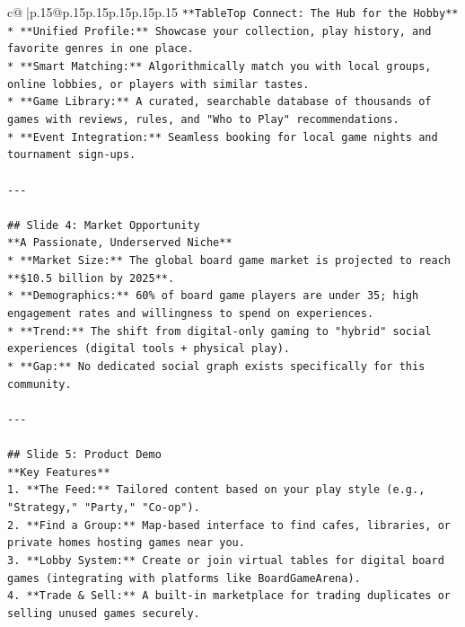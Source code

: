\documentclass{article}
\begin{document}
{\begin{supertabular}{c@{$\;$}|p{.15\linewidth}@{}p{.15\linewidth}p{.15\linewidth}p{.15\linewidth}p{.15\linewidth}p{.15\linewidth}}
{{{\texttt{**TableTop Connect: The Hub for the Hobby**} \\
\texttt{*   **Unified Profile:** Showcase your collection, play history, and favorite genres in one place.} \\
\texttt{*   **Smart Matching:** Algorithmically match you with local groups, online lobbies, or players with similar tastes.} \\
\texttt{*   **Game Library:** A curated, searchable database of thousands of games with reviews, rules, and "Who to Play" recommendations.} \\
\texttt{*   **Event Integration:** Seamless booking for local game nights and tournament sign{-}ups.} \\
\\ 
\texttt{{-}{-}{-}} \\
\\ 
\texttt{\#\# Slide 4: Market Opportunity} \\
\texttt{**A Passionate, Underserved Niche**} \\
\texttt{*   **Market Size:** The global board game market is projected to reach **\$10.5 billion by 2025**.} \\
\texttt{*   **Demographics:** 60\% of board game players are under 35; high engagement rates and willingness to spend on experiences.} \\
\texttt{*   **Trend:** The shift from digital{-}only gaming to "hybrid" social experiences (digital tools + physical play).} \\
\texttt{*   **Gap:** No dedicated social graph exists specifically for this community.} \\
\\ 
\texttt{{-}{-}{-}} \\
\\ 
\texttt{\#\# Slide 5: Product Demo} \\
\texttt{**Key Features**} \\
\texttt{1.  **The Feed:** Tailored content based on your play style (e.g., "Strategy," "Party," "Co{-}op").} \\
\texttt{2.  **Find a Group:** Map{-}based interface to find cafes, libraries, or private homes hosting games near you.} \\
\texttt{3.  **Lobby System:** Create or join virtual tables for digital board games (integrating with platforms like BoardGameArena).} \\
\texttt{4.  **Trade \& Sell:** A built{-}in marketplace for trading duplicates or selling unused games securely.} \\
}}}
\end{supertabular}}
\end{document}
